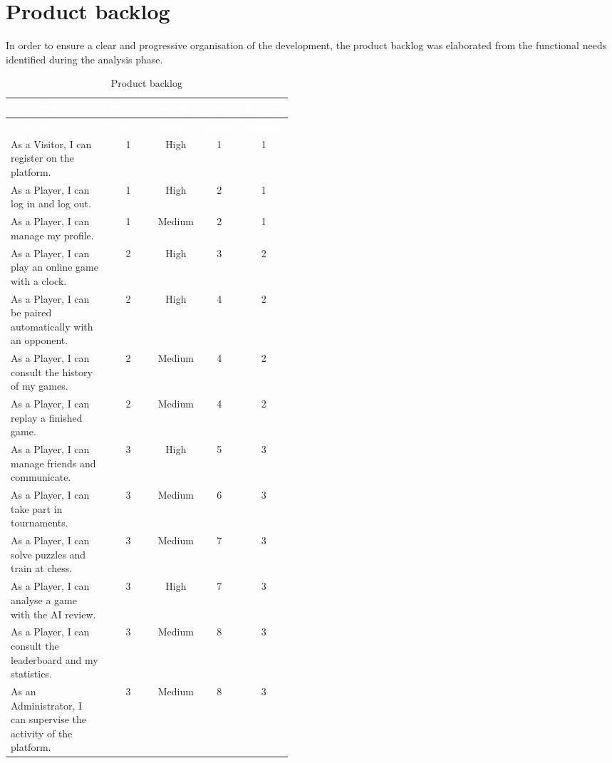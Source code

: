 \documentclass[12pt,a4paper,oneside]{report}
\begin{document}
\section{Product backlog}
In order to ensure a clear and progressive organisation of the development, the product backlog was elaborated from the functional needs identified during the analysis phase.

{\small
\setlength{\tabcolsep}{4pt}
\renewcommand{\arraystretch}{1.28}
\begin{longtable}{|>{\raggedright\arraybackslash}p{0.46\linewidth}|c|c|c|c|}
\caption{Product backlog}
\label{tab:product-backlog}\\
\hline
\rowcolor{sectionblue}
\textcolor{white}{\textbf{User story}} &
\textcolor{white}{\textbf{Priority}} &
\textcolor{white}{\textbf{Estim.}} &
\textcolor{white}{\textbf{Sprint}} &
\textcolor{white}{\textbf{Release}} \\
\hline
\endfirsthead
\hline
\rowcolor{sectionblue}
\textcolor{white}{\textbf{User story}} &
\textcolor{white}{\textbf{Priority}} &
\textcolor{white}{\textbf{Estim.}} &
\textcolor{white}{\textbf{Sprint}} &
\textcolor{white}{\textbf{Release}} \\
\hline
\endhead
As a Visitor, I can register on the platform. & 1 & High & 1 & 1 \\
\hline
As a Player, I can log in and log out. & 1 & High & 2 & 1 \\
\hline
As a Player, I can manage my profile. & 1 & Medium & 2 & 1 \\
\hline
As a Player, I can play an online game with a clock. & 2 & High & 3 & 2 \\
\hline
As a Player, I can be paired automatically with an opponent. & 2 & High & 4 & 2 \\
\hline
As a Player, I can consult the history of my games. & 2 & Medium & 4 & 2 \\
\hline
As a Player, I can replay a finished game. & 2 & Medium & 4 & 2 \\
\hline
As a Player, I can manage friends and communicate. & 3 & High & 5 & 3 \\
\hline
As a Player, I can take part in tournaments. & 3 & Medium & 6 & 3 \\
\hline
As a Player, I can solve puzzles and train at chess. & 3 & Medium & 7 & 3 \\
\hline
As a Player, I can analyse a game with the AI review. & 3 & High & 7 & 3 \\
\hline
As a Player, I can consult the leaderboard and my statistics. & 3 & Medium & 8 & 3 \\
\hline
As an Administrator, I can supervise the activity of the platform. & 3 & Medium & 8 & 3 \\
\hline
\end{longtable}
}
\end{document}
